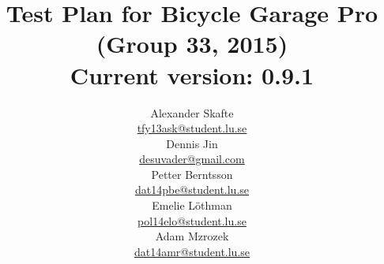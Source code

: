 \title{
	Test Plan for Bicycle Garage Pro\\
	(Group 33, 2015)\\
	\vspace{0.2in}
	\normalsize Current version: 0.9.1
}
\author{
	Alexander Skafte\\
	\url{tfy13ask@student.lu.se}\\
	Dennis Jin\\
	\url{desuvader@gmail.com}\\
	Petter Berntsson\\
	\url{dat14pbe@student.lu.se}\\
	Emelie Löthman\\
	\url{pol14elo@student.lu.se}\\
	Adam Mzrozek\\
	\url{dat14amr@student.lu.se}
}
\date{}

